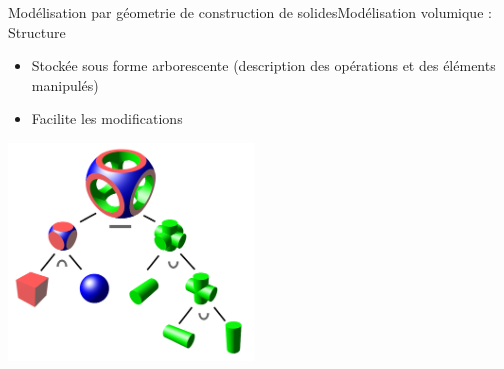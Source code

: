 \documentclass{beamer}
\begin{document}
\begin{frame}[c]{Modélisation par géometrie de construction de solides}{Modélisation volumique : Structure}
\begin{itemize}
\item <1->Stockée sous forme arborescente 
\newline (description des opérations et des éléments manipulés)
\item <1->Facilite les modifications
\end{itemize}
\newline
\begin{center}
\includegraphics[width=65mm]{geo/geoStructure.png}
\end{center}
\newline


\end{frame}
\end{document}

